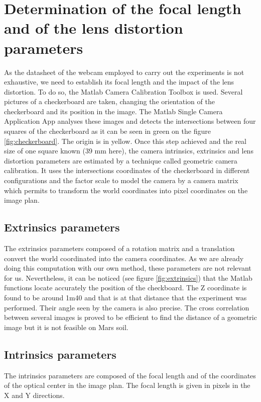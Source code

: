 \section{Determination of the focal length and of the lens distortion parameters}
As the datasheet of the webcam employed to carry out the experiments is not exhaustive, we need to establish its focal length and the impact of the lens distortion. To do so, the Matlab Camera Calibration Toolbox \cite{matlabtoolbox} is used. Several pictures of a checkerboard are taken, changing the orientation of the checkerboard and its position in the image. The Matlab Single Camera Application App analyses these images and detects the intersections between four squares of the checkerboard as it can be seen in green on the figure \ref{fig:checkerboard}. The origin is in yellow. Once this step achieved and the real size of one square known (39 mm here), the camera intrinsics, extrinsics and lens distortion parameters are estimated by a technique called geometric camera calibration. It uses the intersections coordinates of the checkerboard in different configurations and the factor scale to model the camera by a camera matrix which permits to transform the world coordinates into pixel coordinates on the image plan.

\subsection{Extrinsics parameters}
The extrinsics parameters composed of a rotation matrix and a translation convert the world coordinated into the camera coordinates. As we are already doing this computation with our own method, these parameters are not relevant for us. Nevertheless, it can be noticed (see figure \ref{fig:extrinsics}) that the Matlab functions locate accurately the position of the checkboard. The Z coordinate is found to be around 1m40 and that is at that distance that the experiment was performed. Their angle seen by the camera is also precise. The cross correlation between several images is proved to be efficient to find the distance of a geometric image but it is not feasible on Mars soil.

\subsection{Intrinsics parameters}
The intrinsics parameters are composed of the focal length and of the coordinates of the optical center in the image plan. The focal length is given in pixels in the X and Y directions. 

